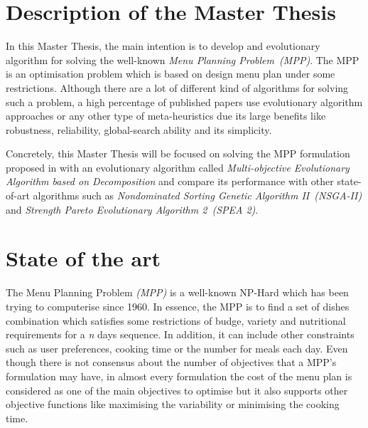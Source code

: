 \section{Description of the Master Thesis}
In this Master Thesis, the main intention is to develop and evolutionary algorithm for solving the well-known \textit{Menu Planning Problem~(MPP)}. The MPP is an optimisation problem which is based on design menu plan under some restrictions. Although there are a lot of different kind of algorithms for solving such a problem, a high percentage of published papers use evolutionary algorithm approaches or any other type of meta-heuristics due its large benefits like robustness, reliability, global-search ability and its simplicity\cite{SELJAK2009414, Moreira2018, Kahraman:2005:HDM:1102256.1102345, Kashima2009, 7257195}. 

Concretely, this Master Thesis will be focused on solving the MPP formulation proposed in \cite{Miranda2018} with an evolutionary algorithm called \textit{Multi-objective Evolutionary Algorithm based on Decomposition} and compare its performance with other state-of-art algorithms such as \textit{Nondominated Sorting Genetic Algorithm II~(NSGA-II)} and \textit{Strength Pareto Evolutionary Algorithm 2~(SPEA 2)}.

\section{State of the art}

The Menu Planning Problem \textit{(MPP)} is a well-known NP-Hard which has been trying to computerise since 1960\cite{Ngo2016}. In essence, the MPP is to find a set of dishes combination which satisfies some restrictions of budge, variety and nutritional requirements for a \textit{n} days sequence. In addition, it can include other constraints such as user preferences, cooking time or the number for meals each day.
Even though there is not consensus about the number of objectives that a MPP's formulation may have, in almost every formulation the cost of the menu plan is considered as one of the main objectives to optimise\cite{Ngo2016, Moreira2018} but it also supports other objective functions like maximising the variability or minimising the cooking time.

